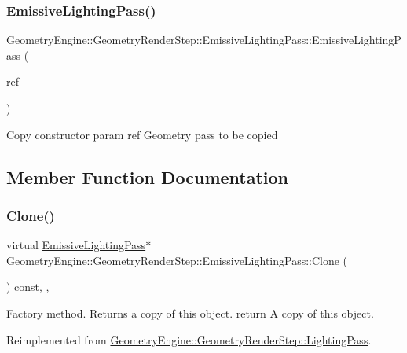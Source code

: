 \subsubsection{\texorpdfstring{EmissiveLightingPass()}{EmissiveLightingPass()}}
{\footnotesize\ttfamily Geometry\+Engine\+::\+Geometry\+Render\+Step\+::\+Emissive\+Lighting\+Pass\+::\+Emissive\+Lighting\+Pass (\begin{DoxyParamCaption}\item[{const \mbox{\hyperlink{class_geometry_engine_1_1_geometry_render_step_1_1_emissive_lighting_pass}{Emissive\+Lighting\+Pass}} \&}]{ref }\end{DoxyParamCaption})\hspace{0.3cm}{\ttfamily [inline]}}

Copy constructor param ref Geometry pass to be copied 

\subsection{Member Function Documentation}
\mbox{\label{class_geometry_engine_1_1_geometry_render_step_1_1_emissive_lighting_pass_a5a46d5e73fe672e09584a2e6e8bfa5e8}} 
\subsubsection{\texorpdfstring{Clone()}{Clone()}}
{\footnotesize\ttfamily virtual \mbox{\hyperlink{class_geometry_engine_1_1_geometry_render_step_1_1_emissive_lighting_pass}{Emissive\+Lighting\+Pass}}$\ast$ Geometry\+Engine\+::\+Geometry\+Render\+Step\+::\+Emissive\+Lighting\+Pass\+::\+Clone (\begin{DoxyParamCaption}{ }\end{DoxyParamCaption}) const\hspace{0.3cm}{\ttfamily [inline]}, {\ttfamily [override]}, {\ttfamily [virtual]}}

Factory method. Returns a copy of this object. return A copy of this object. 

Reimplemented from \mbox{\hyperlink{class_geometry_engine_1_1_geometry_render_step_1_1_lighting_pass_a4f1cb36c7bf6a90d0aa3b8e8feba5e5e}{Geometry\+Engine\+::\+Geometry\+Render\+Step\+::\+Lighting\+Pass}}.

